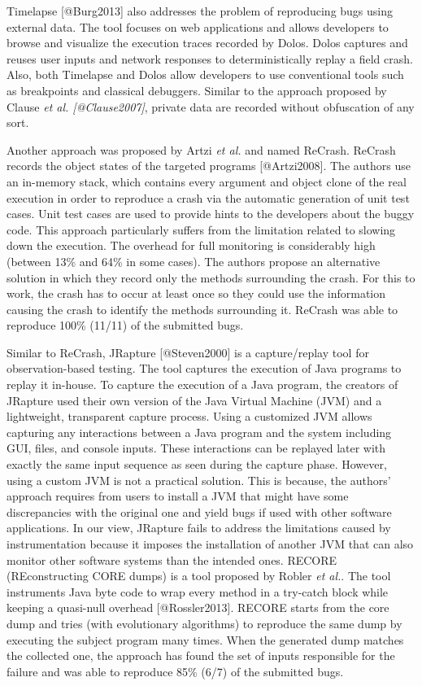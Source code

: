Timelapse {[}@Burg2013{]} also addresses the problem of reproducing bugs
using external data. The tool focuses on web applications and allows
developers to browse and visualize the execution traces recorded by
Dolos. Dolos captures and reuses user inputs and network responses to
deterministically replay a field crash. Also, both Timelapse and Dolos
allow developers to use conventional tools such as breakpoints and
classical debuggers. Similar to the approach proposed by Clause
{\emph{et al. {[}@Clause2007{]}}}, private data are recorded without
obfuscation of any sort.

Another approach was proposed by Artzi {\emph{et al.}} and named
ReCrash. ReCrash records the object states of the targeted programs
{[}@Artzi2008{]}. The authors use an in-memory stack, which contains
every argument and object clone of the real execution in order to
reproduce a crash via the automatic generation of unit test cases. Unit
test cases are used to provide hints to the developers about the buggy
code. This approach particularly suffers from the limitation related to
slowing down the execution. The overhead for full monitoring is
considerably high (between 13\% and 64\% in some cases). The authors
propose an alternative solution in which they record only the methods
surrounding the crash. For this to work, the crash has to occur at least
once so they could use the information causing the crash to identify the
methods surrounding it. ReCrash was able to reproduce 100\% (11/11) of
the submitted bugs.

Similar to ReCrash, JRapture {[}@Steven2000{]} is a capture/replay tool
for observation-based testing. The tool captures the execution of Java
programs to replay it in-house. To capture the execution of a Java
program, the creators of JRapture used their own version of the Java
Virtual Machine (JVM) and a lightweight, transparent capture process.
Using a customized JVM allows capturing any interactions between a Java
program and the system including GUI, files, and console inputs. These
interactions can be replayed later with exactly the same input sequence
as seen during the capture phase. However, using a custom JVM is not a
practical solution. This is because, the authors' approach requires from
users to install a JVM that might have some discrepancies with the
original one and yield bugs if used with other software applications. In
our view, JRapture fails to address the limitations caused by
instrumentation because it imposes the installation of another JVM that
can also monitor other software systems than the intended ones. RECORE
(REconstructing CORE dumps) is a tool proposed by Robler {\emph{et
al.}}. The tool instruments Java byte code to wrap every method in a
try-catch block while keeping a quasi-null overhead {[}@Rossler2013{]}.
RECORE starts from the core dump and tries (with evolutionary
algorithms) to reproduce the same dump by executing the subject program
many times. When the generated dump matches the collected one, the
approach has found the set of inputs responsible for the failure and was
able to reproduce 85\% (6/7) of the submitted bugs.

